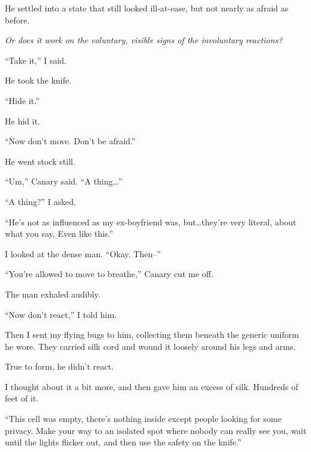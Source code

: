 He settled into a state that still looked ill-at-ease, but not nearly as afraid as before.



\emph{Or does it work on the voluntary, visible signs of the involuntary reactions?}



``Take it,'' I said.



He took the knife.



``Hide it.''



He hid it.



``Now don't move.  Don't be afraid.''



He went stock still.



``Um,'' Canary said.  ``A thing\ldots''



``A thing?'' I asked.



``He's not as influenced as my ex-boyfriend was, but\ldots they're very literal, about what you say.  Even like this.''



I looked at the dense man.  ``Okay.  Then--''



``You're allowed to move to breathe,'' Canary cut me off.



The man exhaled audibly.



``Now don't react,'' I told him.



Then I sent my flying bugs to him, collecting them beneath the generic uniform he wore.  They carried silk cord and wound it loosely around his legs and arms.



True to form, he didn't react.



I thought about it a bit more, and then gave him an excess of silk.  Hundreds of feet of it.



``This cell was empty, there's nothing inside except people looking for some privacy.  Make your way to an isolated spot where nobody can really see you, wait until the lights flicker out, and then use the safety on the knife.''



